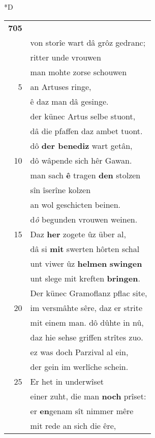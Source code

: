 \documentclass[8pt,a4paper,notitlepage]{article}
\begin{document}
\begin{table}[ht]
\begin{minipage}[t]{0.5\linewidth}
\small
\begin{center}*D
\end{center}
\begin{tabular}{rl}
\textbf{705} & \textit{\begin{large}G\end{large}}awane ein bischof messe sanc.\\ 
 & von storîe wart dâ grôz gedranc;\\ 
 & ritter unde vrouwen\\ 
 & man mohte zorse schouwen\\ 
5 & an Artuses ringe,\\ 
 & ê daz man dâ gesinge.\\ 
 & der künec Artus selbe stuont,\\ 
 & dâ die pfaffen daz ambet tuont.\\ 
 & dô \textbf{der benediz} wart getân,\\ 
10 & dô wâpende sich hêr Gawan.\\ 
 & man sach \textbf{ê} tragen \textbf{den} stolzen\\ 
 & sîn îserîne kolzen\\ 
 & an wol geschicten beinen.\\ 
 & d\textit{ô} begunden vrouwen weinen.\\ 
15 & Daz \textbf{her} zogete ûz über al,\\ 
 & dâ si \textbf{mit} swerten hôrten schal\\ 
 & unt viwer ûz \textbf{helmen} \textbf{swingen}\\ 
 & unt slege mit kreften \textbf{bringen}.\\ 
 & Der künec Gramoflanz pflac site,\\ 
20 & im versmâhte sêre, daz er strite\\ 
 & mit einem man. dô dûhte in nû,\\ 
 & daz hie sehse griffen strîtes zuo.\\ 
 & ez was doch Parzival al ein,\\ 
 & der gein im werlîche schein.\\ 
25 & Er het in underwîset\\ 
 & einer zuht, die man \textbf{noch} prîset:\\ 
 & er \textbf{en}genam sît nimmer mêre\\ 
 & mit rede an sich die êre,\\ 

\end{tabular}
\end{minipage}
\end{table}
\end{document}
